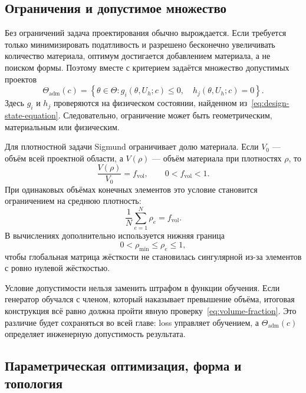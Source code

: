 \subsection{Ограничения и допустимое множество}

Без ограничений задача проектирования обычно вырождается. Если требуется только минимизировать податливость и разрешено бесконечно увеличивать количество материала, оптимум достигается добавлением материала, а не поиском формы. Поэтому вместе с критерием задаётся множество допустимых проектов
\begin{equation}
 \Theta_{\mathrm{adm}}(c)
 =
 \left\{
 \theta\in\Theta:
 g_i(\theta,U_h;c)\leq0,
 \quad
 h_j(\theta,U_h;c)=0
 \right\}.
\end{equation}
Здесь $g_i$ и $h_j$ проверяются на физическом состоянии, найденном из~\eqref{eq:design-state-equation}. Следовательно, ограничение может быть геометрическим, материальным или физическим.

Для плотностной задачи Sigmund ограничивает долю материала. Если $V_0$ --- объём всей проектной области, а $V(\rho)$ --- объём материала при плотностях $\rho$, то
\begin{equation}
\label{eq:volume-fraction}
 \frac{V(\rho)}{V_0}=f_{\mathrm{vol}},
 \qquad
 0<f_{\mathrm{vol}}<1.
\end{equation}
При одинаковых объёмах конечных элементов это условие становится ограничением на среднюю плотность:
\begin{equation}
\label{eq:mean-density}
 \frac{1}{N}\sum_{e=1}^{N}\rho_e=f_{\mathrm{vol}}.
\end{equation}
В вычислениях дополнительно используется нижняя граница
\begin{equation}
\label{eq:density-bounds}
 0<\rho_{\min}\leq\rho_e\leq1,
\end{equation}
чтобы глобальная матрица жёсткости не становилась сингулярной из-за элементов с ровно нулевой жёсткостью.

Условие допустимости нельзя заменить штрафом в функции обучения. Если генератор обучался с членом, который наказывает превышение объёма, итоговая конструкция всё равно должна пройти явную проверку~\eqref{eq:volume-fraction}. Это различие будет сохраняться во всей главе: loss управляет обучением, а $\Theta_{\mathrm{adm}}(c)$ определяет инженерную допустимость результата.

\subsection{Параметрическая оптимизация, форма и топология}

